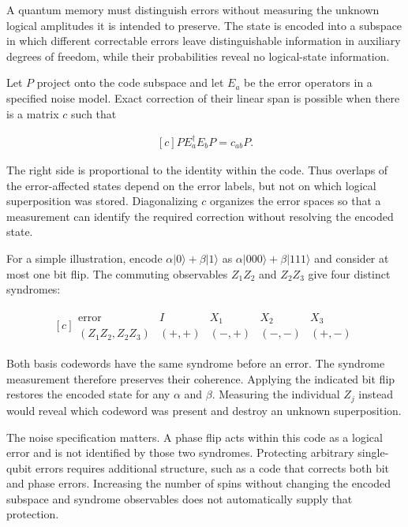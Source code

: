 \documentclass[11pt,oneside]{book}
\newenvironment{centeredalign}{\[\begin{gathered}[c]}{\end{gathered}\]}
\begin{document}
A quantum memory must distinguish errors without measuring the unknown logical amplitudes it is intended to preserve. The state is encoded into a subspace in which different correctable errors leave distinguishable information in auxiliary degrees of freedom, while their probabilities reveal no logical-state information.

Let \(P\) project onto the code subspace and let \(E_a\) be the error operators in a specified noise model. Exact correction of their linear span is possible when there is a matrix \(c\) such that

\begin{centeredalign}
P E_a^\dagger E_b P=c_{ab}P.
\end{centeredalign}

The right side is proportional to the identity within the code. Thus overlaps of the error-affected states depend on the error labels, but not on which logical superposition was stored. Diagonalizing \(c\) organizes the error spaces so that a measurement can identify the required correction without resolving the encoded state.

For a simple illustration, encode \(\alpha|0\rangle+\beta|1\rangle\) as \(\alpha|000\rangle+\beta|111\rangle\) and consider at most one bit flip. The commuting observables \(Z_1Z_2\) and \(Z_2Z_3\) give four distinct syndromes:

\begin{centeredalign}
\begin{array}{c|rrrr}
\text{error}&I&X_1&X_2&X_3\\\hline
(Z_1Z_2,Z_2Z_3)&(+,+)&(-,+)&(-,-)&(+,-)
\end{array}
\end{centeredalign}

Both basis codewords have the same syndrome before an error. The syndrome measurement therefore preserves their coherence. Applying the indicated bit flip restores the encoded state for any \(\alpha\) and \(\beta\). Measuring the individual \(Z_j\) instead would reveal which codeword was present and destroy an unknown superposition.

The noise specification matters. A phase flip acts within this code as a logical error and is not identified by those two syndromes. Protecting arbitrary single-qubit errors requires additional structure, such as a code that corrects both bit and phase errors. Increasing the number of spins without changing the encoded subspace and syndrome observables does not automatically supply that protection.
\end{document}
